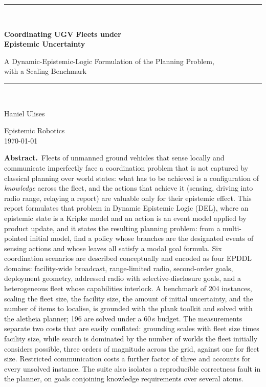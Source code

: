 \documentclass[11pt,a4paper]{article}
\theoremstyle{definition}
\begin{document}
\begin{titlepage}
\centering
\vspace*{2.4cm}
{\color{rulegrey}\rule{\textwidth}{0.8pt}}\\[0.9cm]
{\LARGE\bfseries Coordinating UGV Fleets under\\[0.25cm] Epistemic Uncertainty\par}
\vspace{0.5cm}
{\large\color{slate} A Dynamic-Epistemic-Logic Formulation of the Planning Problem,\\ with a Scaling Benchmark\par}
\vspace{0.7cm}
{\color{rulegrey}\rule{\textwidth}{0.8pt}}\\[1.4cm]

{\large Haniel Ulises\par}
\vspace{0.3cm}
{\color{slate} Epistemic Robotics}\\
\vspace{0.15cm}
{\color{slate}\today}

\vfill
\begin{minipage}{0.86\textwidth}
\small\color{slate}
\textbf{Abstract.}\ Fleets of unmanned ground vehicles that sense locally and
communicate imperfectly face a coordination problem that is not captured by
classical planning over world states: what has to be achieved is a
configuration of \emph{knowledge} across the fleet, and the actions that
achieve it (sensing, driving into radio range, relaying a report) are
valuable only for their epistemic effect. This report formulates that problem
in Dynamic Epistemic Logic (DEL), where an epistemic state is a Kripke model
and an action is an event model applied by product update, and it states the
resulting planning problem: from a multi-pointed initial model, find a policy
whose branches are the designated events of sensing actions and whose leaves
all satisfy a modal goal formula. Six coordination scenarios are described conceptually and
encoded as four EPDDL domains: facility-wide broadcast, range-limited radio,
second-order goals, deployment geometry, addressed radio with
selective-disclosure goals, and a heterogeneous fleet whose capabilities
interlock. A benchmark of 204 instances, scaling the fleet size, the
facility size, the amount of initial uncertainty, and the number of items to
localise, is grounded with the \textsf{plank} toolkit and solved with the
\textsf{aletheia} planner; 196 are solved under a 60\,s budget.
The measurements separate two costs that are easily conflated: grounding
scales with fleet size times facility size, while search is dominated by the
number of worlds the fleet initially considers possible, three orders of
magnitude across the grid, against one for fleet size. Restricted
communication costs a further factor of three and accounts for every unsolved
instance. The suite also isolates a reproducible correctness fault in the
planner, on goals conjoining knowledge requirements over several atoms.
\end{minipage}
\vspace{1.2cm}
\end{titlepage}
\end{document}
